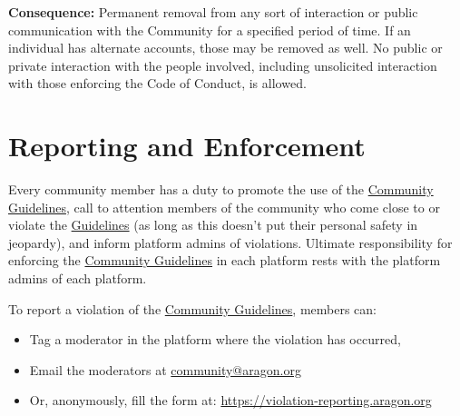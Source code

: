 \textbf{Consequence:} Permanent removal from any sort of interaction or public communication with the Community for a specified period of time.
If an individual has alternate accounts, those may be removed as well.
No public or private interaction with the people involved, including unsolicited interaction with those enforcing the Code of Conduct, is allowed.


\section{Reporting and Enforcement}
\label{sec:ReportingAndEnforcement}
	
Every community member has a duty to promote the use of the \hyperref[chap:CommunityGuidelines]{Community Guidelines}, call to attention members of the community who come close to or violate the \hyperref[chap:CommunityGuidelines]{Guidelines} (as long as this doesn’t put their personal safety in jeopardy), and inform platform admins of violations.
Ultimate responsibility for enforcing the \hyperref[chap:CommunityGuidelines]{Community Guidelines} in each platform rests with the platform admins of each platform.
	
To report a violation of the \hyperref[chap:CommunityGuidelines]{Community Guidelines}, members can:
\begin{itemize}
	\item Tag a moderator in the platform where the violation has occurred,
	\item Email the moderators at \href{community@aragon.org}{community@aragon.org}
	\item Or, anonymously, fill the form at: \href{https://violation-reporting.aragon.org}{https://violation-reporting.aragon.org}
\end{itemize}

